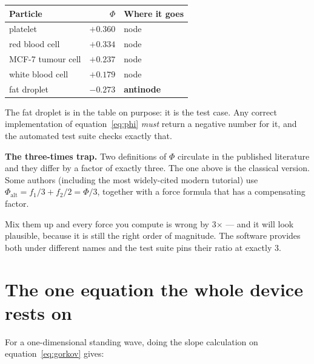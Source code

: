 \documentclass[11pt,a4paper]{article}
\begin{document}
\begin{center}\small
\begin{tabular}{lrl}
\toprule
\textbf{Particle} & $\Phi$ & \textbf{Where it goes} \\
\midrule
platelet & $+0.360$ & node \\
red blood cell & $+0.334$ & node \\
MCF-7 tumour cell & $+0.237$ & node \\
white blood cell & $+0.179$ & node \\
fat droplet & $-0.273$ & \textbf{antinode} \\
\bottomrule
\end{tabular}
\end{center}

The fat droplet is in the table on purpose: it is the test case. Any correct
implementation of equation~\eqref{eq:phi} \emph{must} return a negative number
for it, and the automated test suite checks exactly that.

\begin{warnbox}
\textbf{The three-times trap.} Two definitions of $\Phi$ circulate in the
published literature and they differ by a factor of exactly three. The one
above is the classical version. Some authors (including the most widely-cited
modern tutorial) use $\Phi_{\text{alt}} = f_1/3 + f_2/2 = \Phi/3$, together with
a force formula that has a compensating factor.

Mix them up and every force you compute is wrong by 3$\times$ --- and it will
look plausible, because it is still the right order of magnitude. The software
provides both under different names and the test suite pins their ratio at
exactly 3.
\end{warnbox}

\section{The one equation the whole device rests on}

For a one-dimensional standing wave, doing the slope calculation on
equation~\eqref{eq:gorkov} gives:
\end{document}
